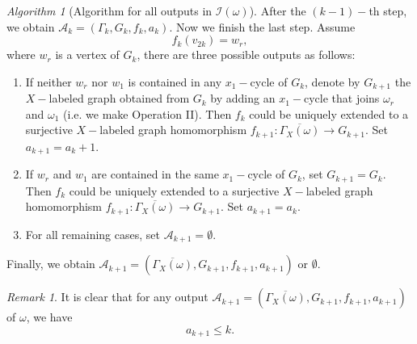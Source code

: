 \documentclass{amsart}
\theoremstyle{plain}
\theoremstyle{definition}
\theoremstyle{remark}
\newtheorem*{rem*}{Remark}
\newtheorem*{Algo*}{Algorithm}
\begin{document}
\begin{Algo*}[Algorithm for all outputs in $\mathcal{I}(\omega)$]
 \noindent After the $(k-1)-$th step, we obtain $\mathcal{A}_k=(\Gamma_{k},G_k,f_k,a_k)$. Now we finish the last step. Assume $$f_k(v_{2k})=w_r,$$ where $w_r$ is a vertex of $G_k$, there are three possible outputs as follows:
\begin{enumerate}
    \item If neither  $w_r$ nor $w_1$ is contained in any $x_1-$cycle of $G_k$, denote by $G_{k+1}$ the $X-$labeled graph obtained from $G_k$ by adding an $x_1-$cycle that joins $\omega_r$ and $\omega_1$ (i.e. we make Operation II). Then $f_k$ could be uniquely extended to a surjective $X-$labeled graph homomorphism $f_{k+1}:\overline{\Gamma_X(\omega)}\to G_{k+1}$. Set $a_{k+1}=a_k+1$.
    \item If $w_r$ and $w_1$ are contained in the same $x_1-$cycle of $G_k$, set $G_{k+1}=G_k$. Then $f_k$ could be uniquely extended to a surjective $X-$labeled graph homomorphism $f_{k+1}:\overline{\Gamma_X(\omega)}\to G_{k+1}$. Set $a_{k+1}=a_k$.
    \item For all remaining cases, set $\mathcal{A}_{k+1}=\emptyset.$
\end{enumerate}
Finally, we obtain $\mathcal{A}_{k+1}=\left(\overline{\Gamma_X(\omega)},G_{k+1},f_{k+1},a_{k+1}\right)$ or $\emptyset$.
\end{Algo*}

\begin{rem*}
It is clear that for any output $\mathcal{A}_{k+1}=\left(\overline{\Gamma_X(\omega)},G_{k+1},f_{k+1},a_{k+1}\right)$ of $\omega$, we have
$$a_{k+1}\leq k.$$
\end{rem*}
\end{document}
